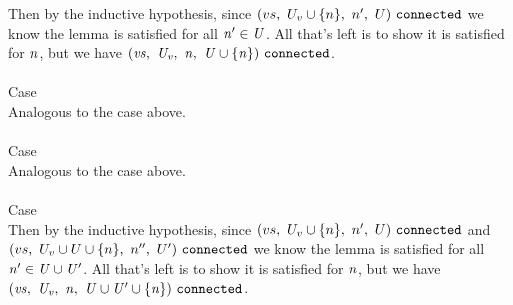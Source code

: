 \documentclass[12pt]{article}
\begin{document}
Then by the inductive hypothesis, since $(vs,\ U_v \cup
  \{n\},\ n',\ U)\ \mathtt{connected}$ we know the lemma is satisfied for all
$\mathit{n'} \in \mathit{U}$. All that's left is to show it is satisfied for
$\mathit{n}$, but we have
$(\mathit{vs},\ \mathit{U_v},\ \mathit{n},\ \mathit{U} \cup
  \{\mathit{n}\})\ \mathtt{connected}$.\\
\\

Case
\\

Analogous to the case above.\\
\\

Case
\\

Analogous to the case above.\\
\\

Case
\\

Then by the inductive hypothesis, since $(vs,\ U_v \cup
  \{n\},\ n',\ U)\ \mathtt{connected}$ and $(vs,\ U_v \cup U \cup
  \{n\},\ n'',\ U')\ \mathtt{connected}$ we know the lemma is satisfied for all
$\mathit{n'} \in \mathit{U} \cup \mathit{U'}$. All that's left is to show it is
satisfied for $\mathit{n}$, but we have
$(\mathit{vs},\ \mathit{U_v},\ \mathit{n},\ \mathit{U} \cup \mathit{U'} \cup
  \{\mathit{n}\})\ \mathtt{connected}$.\\
\\
\end{document}
